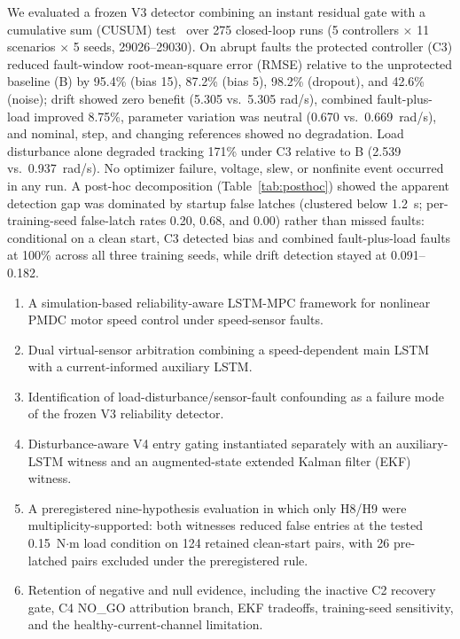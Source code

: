 \documentclass[conference]{IEEEtran}
\begin{document}
We evaluated a frozen V3 detector combining an instant residual gate with a
cumulative sum (CUSUM) test~\cite{Page1954} over 275 closed-loop runs (5 controllers
$\times$ 11 scenarios $\times$ 5 seeds, 29026--29030). On abrupt faults
the protected controller (C3) reduced fault-window root-mean-square error
(RMSE) relative to the
unprotected baseline (B) by 95.4\% (bias 15), 87.2\% (bias 5), 98.2\%
(dropout), and 42.6\% (noise); drift showed zero benefit (5.305 vs.\ 5.305
rad/s), combined fault-plus-load improved 8.75\%, parameter variation was
neutral (0.670 vs.\ 0.669~rad/s), and nominal, step, and changing
references showed no degradation. Load disturbance alone degraded tracking
171\% under C3 relative to B (2.539 vs.\ 0.937~rad/s). No optimizer
failure, voltage, slew, or nonfinite event occurred in any run. A post-hoc
decomposition (Table~\ref{tab:posthoc}) showed the apparent detection gap
was dominated by startup false latches (clustered below 1.2~s;
per-training-seed false-latch rates 0.20, 0.68, and 0.00) rather than
missed faults: conditional on a clean start, C3 detected bias and combined
fault-plus-load faults at 100\% across all three training seeds, while
drift detection stayed at 0.091--0.182.

\begin{enumerate}
\item A simulation-based reliability-aware LSTM-MPC framework for nonlinear
PMDC motor speed control under speed-sensor faults.
\item Dual virtual-sensor arbitration combining a speed-dependent main LSTM
with a current-informed auxiliary LSTM.
\item Identification of load-disturbance/sensor-fault confounding as a
failure mode of the frozen V3 reliability detector.
\item Disturbance-aware V4 entry gating instantiated separately with an
auxiliary-LSTM witness and an augmented-state extended Kalman filter (EKF) witness.
\item A preregistered nine-hypothesis evaluation in which only H8/H9 were
multiplicity-supported: both witnesses reduced false entries at the tested
0.15~N$\cdot$m load condition on 124 retained clean-start pairs, with 26
pre-latched pairs excluded under the preregistered rule.
\item Retention of negative and null evidence, including the inactive C2
recovery gate, C4 NO\_GO attribution branch, EKF tradeoffs, training-seed
sensitivity, and the healthy-current-channel limitation.
\end{enumerate}
\end{document}
